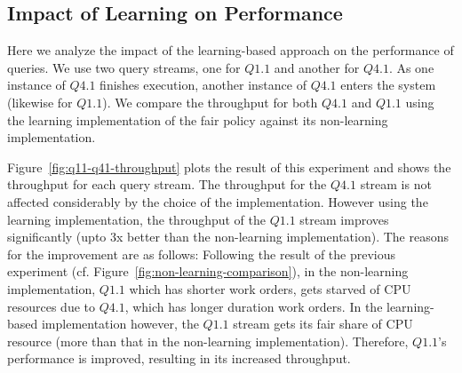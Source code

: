 \subsection{Impact of Learning on Performance}\label{ssec:learning-impact-perf}
Here we analyze the impact of the learning-based approach on the performance of queries. 
We use two query streams, one for $Q1.1$ and another for $Q4.1$.
As one instance of $Q4.1$ finishes execution, another instance of $Q4.1$ enters the system (likewise for $Q1.1$).
We compare the throughput for both $Q4.1$ and $Q1.1$ using the learning implementation of the fair policy against its non-learning implementation.



Figure~\ref{fig:q11-q41-throughput} plots the result of this experiment and shows the throughput for each query stream. 
The throughput for the $Q4.1$ stream is not affected considerably by the choice of the implementation. 
However using the learning implementation, the throughput of the $Q1.1$ stream improves significantly (upto 3x better than the non-learning implementation). 
The reasons for the improvement are as follows:
Following the result of the previous experiment (cf. Figure~\ref{fig:non-learning-comparison}), in the non-learning implementation, $Q1.1$ which has shorter work orders, gets starved of CPU resources due to $Q4.1$, which has longer duration work orders. 
In the learning-based implementation however, the $Q1.1$ stream gets its fair share of CPU resource (more than that in the non-learning implementation). 
Therefore, $Q1.1$'s performance is improved, resulting in its increased throughput. 

